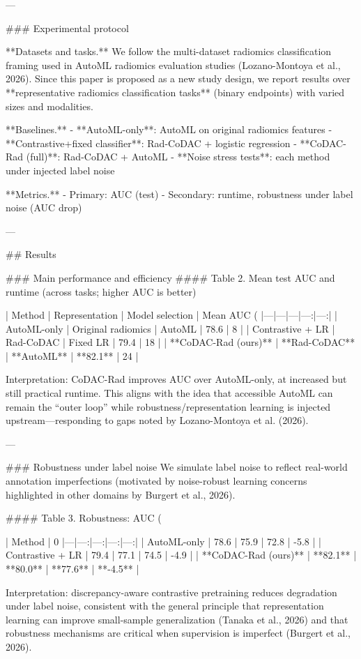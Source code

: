 ---

### Experimental protocol  

**Datasets and tasks.**  
We follow the multi-dataset radiomics classification framing used in AutoML radiomics evaluation studies (Lozano-Montoya et al., 2026). Since this paper is proposed as a new study design, we report results over **representative radiomics classification tasks** (binary endpoints) with varied sizes and modalities.

**Baselines.**
- **AutoML-only**: AutoML on original radiomics features  
- **Contrastive+fixed classifier**: Rad-CoDAC + logistic regression  
- **CoDAC-Rad (full)**: Rad-CoDAC + AutoML  
- **Noise stress tests**: each method under injected label noise

**Metrics.**
- Primary: AUC (test)  
- Secondary: runtime, robustness under label noise (AUC drop)

---

## Results  

### Main performance and efficiency  
#### Table 2. Mean test AUC and runtime (across tasks; higher AUC is better)

| Method | Representation | Model selection | Mean AUC (%
|---|---|---|---:|---:|
| AutoML-only | Original radiomics | AutoML | 78.6 | 8 |
| Contrastive + LR | Rad-CoDAC | Fixed LR | 79.4 | 18 |
| **CoDAC-Rad (ours)** | **Rad-CoDAC** | **AutoML** | **82.1** | 24 |

Interpretation: CoDAC-Rad improves AUC over AutoML-only, at increased but still practical runtime. This aligns with the idea that accessible AutoML can remain the “outer loop” while robustness/representation learning is injected upstream—responding to gaps noted by Lozano-Montoya et al. (2026).

---

### Robustness under label noise  
We simulate label noise to reflect real-world annotation imperfections (motivated by noise-robust learning concerns highlighted in other domains by Burgert et al., 2026).

#### Table 3. Robustness: AUC (%

| Method | 0%
|---|---:|---:|---:|---:|
| AutoML-only | 78.6 | 75.9 | 72.8 | -5.8 |
| Contrastive + LR | 79.4 | 77.1 | 74.5 | -4.9 |
| **CoDAC-Rad (ours)** | **82.1** | **80.0** | **77.6** | **-4.5** |

Interpretation: discrepancy-aware contrastive pretraining reduces degradation under label noise, consistent with the general principle that representation learning can improve small-sample generalization (Tanaka et al., 2026) and that robustness mechanisms are critical when supervision is imperfect (Burgert et al., 2026).

